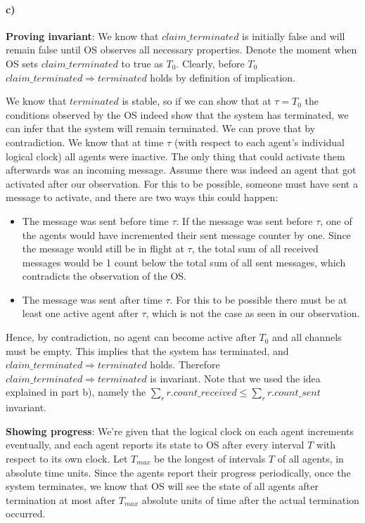 \documentclass[10pt,letter]{article}
\begin{document}
 \paragraph{c)} \textbf{Proving invariant}: We know that $claim\_terminated$ is initially false and will remain false until OS observes all necessary properties. Denote the moment when OS sets $claim\_terminated$ to true as $T_0$. Clearly, before $T_0$ $claim\_terminated \Rightarrow terminated$ holds by definition of implication.

We know that $terminated$ is stable, so if we can show that at $\tau = T_0$ the conditions observed by the OS indeed show that the system has terminated, we can infer that the system will remain terminated. We can prove that by contradiction. We know that at time $\tau$ (with respect to each agent's individual logical clock) all agents were inactive. The only thing that could activate them afterwards was an incoming message. Assume there was indeed an agent that got activated after our observation. For this to be possible, someone must have sent a message to activate, and there are two ways this could happen:

\begin{itemize}
\item The message was sent before time $\tau$. If the message was sent before $\tau$, one of the agents would have incremented their sent message counter by one. Since the message would still be in flight at $\tau$, the total sum of all received messages would be 1 count below the total sum of all sent messages, which contradicts the observation of the OS.
\item The message was sent after time $\tau$. For this to be possible there must be at least one active agent after $\tau$, which is not the case as seen in our observation.
\end{itemize}

Hence, by contradiction, no agent can become active after $T_0$ and all channels must be empty. This implies that the system has terminated, and $claim\_terminated \Rightarrow terminated$ holds. Therefore $claim\_terminated \Rightarrow terminated$ is invariant. Note that we used the idea explained in part b), namely the $\sum\limits_{r} r.count\_received \leq \sum\limits_{r} r.count\_sent$ invariant.

\textbf{Showing progress}: We're given that the logical clock on each agent increments eventually, and each agent reports its state to OS after every interval $T$ with respect to its own clock. Let $T_{max}$ be the longest of intervals $T$ of all agents, in absolute time units. Since the agents report their progress periodically, once the system terminates, we know that OS will see the state of all agents after termination at most after $T_{max}$ absolute units of time after the actual termination occurred.
\end{document}
